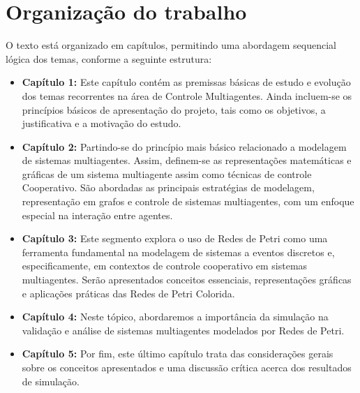 \section{Organização do trabalho}
O texto está organizado em capítulos, permitindo uma abordagem sequencial lógica
dos temas, conforme a seguinte estrutura:
\begin{itemize}
\item \textbf{Capítulo 1:} Este capítulo contém as premissas básicas de estudo e evolução dos temas recorrentes na área de Controle Multiagentes. Ainda incluem-se os princípios básicos de apresentação do projeto, tais como os objetivos, a justificativa e a motivação do estudo.

\item \textbf{Capítulo 2: } Partindo-se do princípio mais básico relacionado a modelagem de sistemas multiagentes. Assim, definem-se as representações matemáticas e gráficas de um sistema multiagente assim como técnicas de controle Cooperativo. São abordadas as principais estratégias de modelagem, representação em grafos e controle de sistemas multiagentes, com um enfoque especial na interação entre agentes.
    
\item \textbf{Capítulo 3: } Este segmento explora o uso de Redes de Petri como uma ferramenta fundamental na modelagem de sistemas a eventos discretos e, especificamente, em contextos de controle cooperativo em sistemas multiagentes. Serão apresentados conceitos essenciais, representações gráficas e aplicações práticas das Redes de Petri Colorida.
    
\item \textbf{Capítulo 4:}  Neste tópico, abordaremos a importância da simulação na validação e análise de sistemas multiagentes modelados por Redes de Petri. 
    
\item \textbf{Capítulo 5:} Por fim, este último capítulo trata das considerações gerais sobre os conceitos apresentados e uma discussão crítica acerca dos resultados de simulação.
\end{itemize}


	

